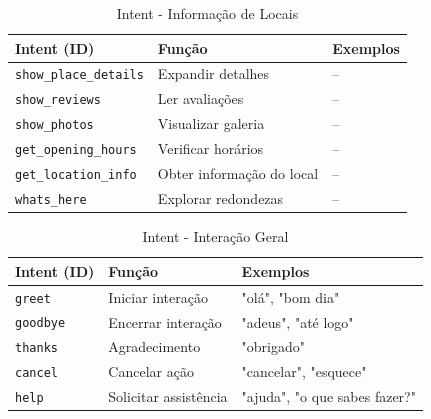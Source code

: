 \documentclass{report}
\begin{document}
\begin{longtable}{p{} p{} p{}}
    \caption{Intent - Informação de Locais} 
    \label{tab:intents_informacao_locais} \\
    
    \toprule
    \textbf{Intent (ID)} & \textbf{Função} & \textbf{Exemplos} \\
    \midrule
    \endfirsthead
    \endlastfoot

    \texttt{show\_place\_details} & Expandir detalhes & -- \\
    \texttt{show\_reviews} & Ler avaliações & -- \\
    \texttt{show\_photos} & Visualizar galeria & -- \\
    \texttt{get\_opening\_hours} & Verificar horários & -- \\
    \texttt{get\_location\_info} & Obter informação do local & -- \\
    \texttt{whats\_here} & Explorar redondezas & -- \\
\end{longtable}


\begin{longtable}{p{} p{} p{}}
    \caption{Intent - Interação Geral} 
    \label{tab:intents_interacao_geral} \\
    
    \toprule
    \textbf{Intent (ID)} & \textbf{Função} & \textbf{Exemplos} \\
    \midrule
    \endfirsthead
    \endlastfoot

    \texttt{greet} & Iniciar interação & "olá", "bom dia" \\
    \texttt{goodbye} & Encerrar interação & "adeus", "até logo" \\
    \texttt{thanks} & Agradecimento & "obrigado" \\
    \texttt{cancel} & Cancelar ação & "cancelar", "esquece" \\
    \texttt{help} & Solicitar assistência & "ajuda", "o que sabes fazer?" \\
\end{longtable}
\end{document}
